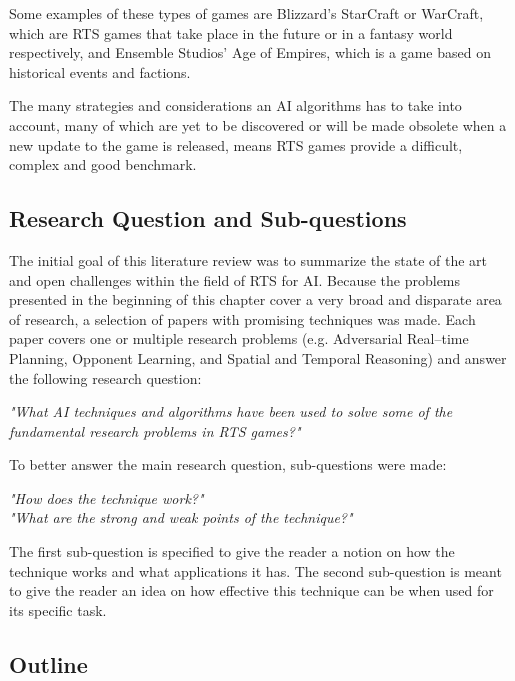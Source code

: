 Some examples of these types of games are Blizzard's StarCraft\citep{starcraftgame} or WarCraft\citep{warcraftgame}, which are RTS games that take place in the future or in a fantasy world respectively, and Ensemble Studios' Age of Empires\citep{ageofempiresgame}, which is a game based on historical events and factions.

The many strategies and considerations an AI algorithms has to take into account, many of which are yet to be discovered or will be made obsolete when a new update to the game is released, means RTS games provide a difficult, complex and good benchmark.

\subsection{Research Question and Sub-questions}

The initial goal of this literature review was to summarize the state of the art and open challenges within the field of RTS for AI. Because the problems presented in the beginning of this chapter cover a very broad and disparate area of research, a selection of papers with promising techniques was made. Each paper covers one or multiple research problems (e.g. Adversarial Real–time Planning, Opponent Learning, and Spatial and Temporal Reasoning) and answer the following research question:

\vspace{2mm}
\textit{"What AI techniques and algorithms have been used to solve some of the fundamental research problems in RTS games?"}
\vspace{2mm}


To better answer the main research question, sub-questions were made:
\begin{description}
\item[\textit{"How does the technique work?"}]
\item[\textit{"What are the strong and weak points of the technique?"}]
\end{description}

The first sub-question is specified to give the reader a notion on how the technique works and what applications it has. The second sub-question is meant to give the reader an idea on how effective this technique can be when used for its specific task.

\subsection{Outline}

